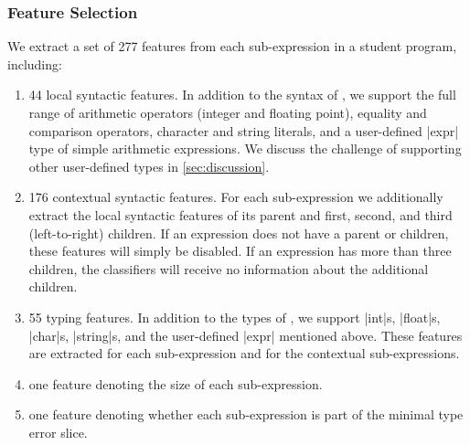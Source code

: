 \subsubsection{Feature Selection}
We extract a set of 277 features from each sub-expression in a student
program, including:
%
\begin{enumerate}
\item 44 local syntactic features. In addition to the syntax of \lang,
  we support the full range of arithmetic operators (integer and
  floating point), equality and comparison operators, character and
  string literals, and a user-defined |expr| type of simple arithmetic
  expressions. We discuss the challenge of supporting other
  user-defined types in \autoref{sec:discussion}.
\item 176 contextual syntactic features. For each sub-expression we
  additionally extract the local syntactic features of its parent and
  first, second, and third (left-to-right) children. If an expression
  does not have a parent or children, these features will simply be
  disabled. If an expression has more than three children, the
  classifiers will receive no information about the additional
  children.
\item 55 typing features. In addition to the types of \lang, we support
  |int|s, |float|s, |char|s, |string|s, and the user-defined |expr|
  mentioned above. These features are extracted for each sub-expression
  and for the contextual sub-expressions.
\item one feature denoting the size of each sub-expression.
\item one feature denoting whether each sub-expression is part of the
  minimal type error slice.
\end{enumerate}

